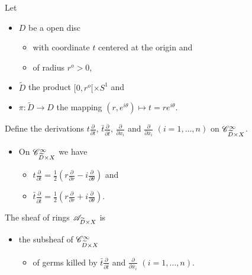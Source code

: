 Let
\begin{itemize}
  \item $D$ be a open disc
    \begin{itemize}
      \item with coordinate $t$ centered at the origin and
      \item of radius $r^o>0$,
    \end{itemize}
  \item $\tilde D$ the product $[0,r^o[\times S^1$ and
  \item $\pi: \tilde D\to D$ the mapping
    $(r,e^{i\theta})\mapsto t=re^{i\theta}$.
\end{itemize}
Define the derivations
$t\frac{\partial}{\partial t}$, $\bar t\frac{\partial}{\partial\bar t}$,
$\frac{\partial}{\partial x_i}$ and $\frac{\partial}{\partial\bar x_i}$
$(i=1,\dots,n)$ on $\mathscr{C}_{\widetilde D\times X}^\infty$.
\begin{itemize}
  \item On $\mathscr{C}_{\widetilde D\times X}^\infty$ we have
    \begin{itemize}
      \item $t\frac{\partial}{\partial t}=
              \frac{1}{2}\left(r\frac{\partial}{\partial r}
              -i\frac{\partial}{\partial\theta} \right)$ and
      \item $\bar t\frac{\partial}{\partial\bar t}=
              \frac{1}{2}\left(r\frac{\partial}{\partial r}
              +i\frac{\partial}{\partial\theta} \right)$.
    \end{itemize}
\end{itemize}
\begin{defn}[II.5.10]
  The sheaf of rings $\mathscr{A}_{\widetilde D\times X}$ is
  \begin{itemize}
    \item the subsheaf of $\mathscr{C}_{\widetilde D\times X}^\infty$
      \begin{itemize}
        \item of germs killed by $\bar t\frac{\partial}{\partial\bar t}$ and
          $\frac{\partial}{\partial\bar x_i}$ $(i=1,\dots,n)$.
      \end{itemize}
  \end{itemize}
\end{defn}
